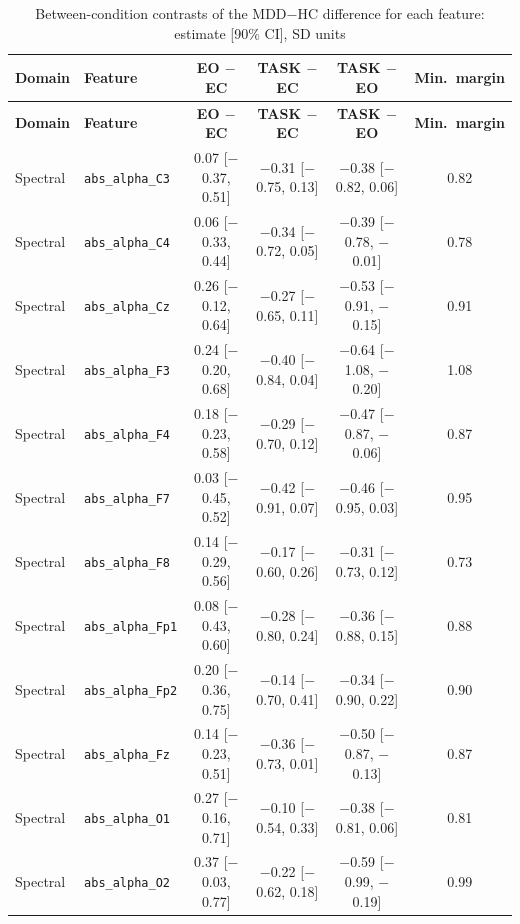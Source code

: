 {\scriptsize
\setlength{\tabcolsep}{3pt}
\begin{longtable}{llcccc}
\caption{Between-condition contrasts of the MDD$-$HC difference for each feature: estimate [90\% CI], SD units}\label{tabS_contrastes_completa}\\
\toprule
\textbf{Domain} & \textbf{Feature} & \textbf{EO $-$ EC} & \textbf{TASK $-$ EC} & \textbf{TASK $-$ EO} & \textbf{Min.\ margin} \\
\midrule
\endfirsthead
\toprule
\textbf{Domain} & \textbf{Feature} & \textbf{EO $-$ EC} & \textbf{TASK $-$ EC} & \textbf{TASK $-$ EO} & \textbf{Min.\ margin} \\
\midrule
\endhead
\bottomrule
\endfoot
Spectral & \texttt{abs\_alpha\_C3} & 0.07 [$-$0.37, 0.51] & $-$0.31 [$-$0.75, 0.13] & $-$0.38 [$-$0.82, 0.06] & 0.82 \\
Spectral & \texttt{abs\_alpha\_C4} & 0.06 [$-$0.33, 0.44] & $-$0.34 [$-$0.72, 0.05] & $-$0.39 [$-$0.78, $-$0.01] & 0.78 \\
Spectral & \texttt{abs\_alpha\_Cz} & 0.26 [$-$0.12, 0.64] & $-$0.27 [$-$0.65, 0.11] & $-$0.53 [$-$0.91, $-$0.15] & 0.91 \\
Spectral & \texttt{abs\_alpha\_F3} & 0.24 [$-$0.20, 0.68] & $-$0.40 [$-$0.84, 0.04] & $-$0.64 [$-$1.08, $-$0.20] & 1.08 \\
Spectral & \texttt{abs\_alpha\_F4} & 0.18 [$-$0.23, 0.58] & $-$0.29 [$-$0.70, 0.12] & $-$0.47 [$-$0.87, $-$0.06] & 0.87 \\
Spectral & \texttt{abs\_alpha\_F7} & 0.03 [$-$0.45, 0.52] & $-$0.42 [$-$0.91, 0.07] & $-$0.46 [$-$0.95, 0.03] & 0.95 \\
Spectral & \texttt{abs\_alpha\_F8} & 0.14 [$-$0.29, 0.56] & $-$0.17 [$-$0.60, 0.26] & $-$0.31 [$-$0.73, 0.12] & 0.73 \\
Spectral & \texttt{abs\_alpha\_Fp1} & 0.08 [$-$0.43, 0.60] & $-$0.28 [$-$0.80, 0.24] & $-$0.36 [$-$0.88, 0.15] & 0.88 \\
Spectral & \texttt{abs\_alpha\_Fp2} & 0.20 [$-$0.36, 0.75] & $-$0.14 [$-$0.70, 0.41] & $-$0.34 [$-$0.90, 0.22] & 0.90 \\
Spectral & \texttt{abs\_alpha\_Fz} & 0.14 [$-$0.23, 0.51] & $-$0.36 [$-$0.73, 0.01] & $-$0.50 [$-$0.87, $-$0.13] & 0.87 \\
Spectral & \texttt{abs\_alpha\_O1} & 0.27 [$-$0.16, 0.71] & $-$0.10 [$-$0.54, 0.33] & $-$0.38 [$-$0.81, 0.06] & 0.81 \\
Spectral & \texttt{abs\_alpha\_O2} & 0.37 [$-$0.03, 0.77] & $-$0.22 [$-$0.62, 0.18] & $-$0.59 [$-$0.99, $-$0.19] & 0.99 \\

\end{longtable}}
